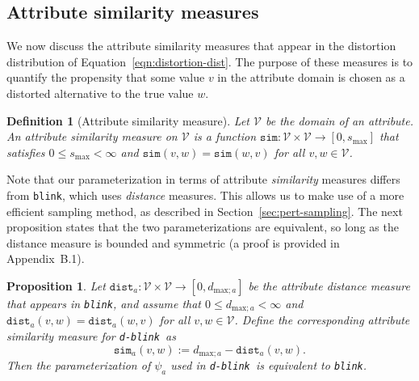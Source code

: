 \documentclass[12pt,letterpaper]{article}
\newcommand{\simfn}{\mathtt{sim}} %
\newcommand{\distfn}{\mathtt{dist}} %
\newcommand{\valset}{\mathcal{V}} %
\newcommand{\1}[1]{\mathbb{I}\!\left[#1\right]} %
\newcommand{\dblink}{\texttt{\upshape \lowercase{d-blink}}} %
\newcommand{\blink}{\texttt{\upshape \lowercase{blink}}} %
\newtheorem{proposition}{Proposition}
\newtheorem*{definition}{Definition}
\begin{document}
\subsection{Attribute similarity measures}
\label{sec:attribute-sim-measure}
We now discuss the attribute similarity measures that appear 
in the distortion distribution of Equation~\ref{eqn:distortion-dist}.
The purpose of these measures is to quantify the 
propensity that some value $v$ in the attribute domain is 
chosen as a distorted alternative to the true value $w$.
\begin{definition}[Attribute similarity measure]
  \label{def:attribute-sim-measure}
  Let $\valset$ be the domain of an attribute.
  An \emph{attribute similarity measure} on $\valset$ is a 
  function $\simfn: \valset \times \valset \to [0, s_\mathrm{max}]$
  that satisfies $0 \leq s_\mathrm{max} < \infty$ and 
  $\simfn(v,w) = \simfn(w,v)$ for all $v, w \in \valset$.
\end{definition}


Note that our parameterization in terms of attribute \emph{similarity} 
measures differs from \blink, which uses \emph{distance} measures.
This allows us to make use of a more efficient sampling method, as described 
in Section~\ref{sec:pert-sampling}. 
The next proposition states that the two parameterizations are equivalent, 
so long as the distance measure is bounded and symmetric (a proof is 
provided in Appendix~B.1).
\begin{proposition}
  \label{thm:sim-dist-equiv}
  Let $\distfn_{a}: \valset \times \valset \to [0, d_{\mathrm{max};a}]$ 
  be the attribute distance measure that appears in \blink, 
  and assume that $0 \leq d_{\mathrm{max};a} < \infty$ and 
  $\distfn_{a}(v, w) = \distfn_{a}(w, v)$ for all $v,w \in \valset$. 
  Define the corresponding attribute similarity measure 
  for \dblink\ as
  \begin{equation}
  \simfn_{a}(v, w) := d_{\mathrm{max};a} - \distfn_{a}(v, w).
  \label{eqn:simfn-distfn-correspondence}
  \end{equation}
  Then the parameterization of %
  $\psi_{a}$ used in \dblink\ is equivalent to \blink.
\end{proposition}
\end{document}
